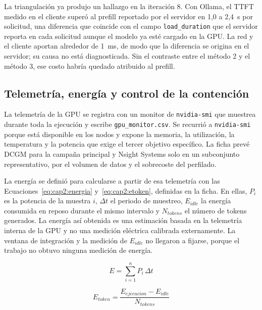La triangulación ya produjo un hallazgo en la iteración 8. Con Ollama, el TTFT medido en el cliente superó al prefill reportado por el servidor en 1,0 a 2,4~s por solicitud, una diferencia que coincide con el campo \texttt{load\_duration} que el servidor reporta en cada solicitud aunque el modelo ya esté cargado en la GPU. La red y el cliente aportan alrededor de 1~ms, de modo que la diferencia se origina en el servidor; su causa no está diagnosticada. Sin el contraste entre el método 2 y el método 3, ese costo habría quedado atribuido al prefill.

\subsection{Telemetría, energía y control de la contención}
\label{sec:cap2:control}

La telemetría de la GPU se registra con un monitor de \texttt{nvidia-smi} que muestrea durante toda la ejecución y escribe \texttt{gpu\_monitor.csv}. Se recurrió a \texttt{nvidia-smi} porque está disponible en los nodos y expone la memoria, la utilización, la temperatura y la potencia que exige el tercer objetivo específico. La ficha prevé DCGM para la campaña principal y Nsight Systems solo en un subconjunto representativo, por el volumen de datos y el sobrecoste del perfilado.

La energía se definió para calcularse a partir de esa telemetría con las Ecuaciones~\ref{eq:cap2:energia} y~\ref{eq:cap2:etoken}, definidas en la ficha. En ellas, $P_i$ es la potencia de la muestra $i$, $\Delta t$ el periodo de muestreo, $E_{idle}$ la energía consumida en reposo durante el mismo intervalo y $N_{tokens}$ el número de tokens generados. La energía así obtenida es una estimación basada en la telemetría interna de la GPU y no una medición eléctrica calibrada externamente. La ventana de integración y la medición de $E_{idle}$ no llegaron a fijarse, porque el trabajo no obtuvo ninguna medición de energía.

\begin{equation}
\label{eq:cap2:energia}
E = \sum_{i=1}^{n} P_i \, \Delta t
\end{equation}

\begin{equation}
\label{eq:cap2:etoken}
E_{token} = \frac{E_{ejecucion} - E_{idle}}{N_{tokens}}
\end{equation}

